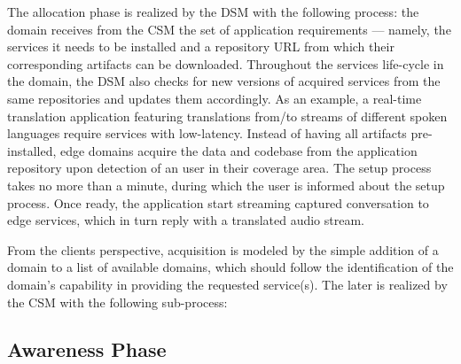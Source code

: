 The allocation phase is realized by the DSM with the following process: the domain receives from the CSM the set of application requirements --- namely, the services it needs to be installed and a repository URL from which their corresponding artifacts can be downloaded. Throughout the services life-cycle in the domain, the DSM also checks for new versions of acquired services from the same repositories and updates them accordingly. As an example, a real-time translation application featuring translations from/to streams of different spoken languages require services with low-latency. Instead of having all artifacts pre-installed, edge domains acquire the data and codebase from the application repository upon detection of an user in their coverage area. The setup process takes no more than a minute, during which the user is informed about the setup process. Once ready, the application start streaming captured conversation to edge services, which in turn reply with a translated audio stream. 


From the clients perspective, acquisition is modeled by the simple addition of a domain to a list of available domains, which should follow the identification of the domain's capability in providing the requested service(s). The later is realized by the CSM with the following sub-process: 





\subsection{Awareness Phase}\label{sec:A3-E-awareness}



